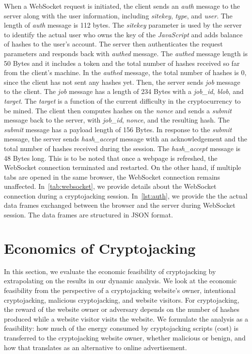 \documentclass[acmlarge]{acmart}
\newcommand{\js}{{\em JavaScript}\xspace}
\newcommand{\cj}{cryptojacking\xspace}
\begin{document}
When a WebSocket request is initiated, the client sends an {\em auth} message to the server along with the user information, including {\em sitekey}, {\em type}, and {\em user}. The length of {\em auth} message is 112 bytes. The {\em sitekey} parameter is used by the server to identify the actual user who owns the key of the \js and adds balance of hashes to the user's account. The server then authenticates the request parameters and responds back with {\em authed} message. The {\em authed} message length is 50 Bytes and it includes a token and the total number of hashes received so far from the client's machine. In the {\em authed} message,  the total number of hashes is 0, since the client has not sent any hashes yet. Then, the server sends {\em job} message to the client. The {\em job} message has a length of 234 Bytes with a {\em job\_id}, {\em blob}, and {\em target}. The {\em target} is a function of the current difficulty in the cryptocurrency to be mined. The client then computes hashes on the {\em nonce} and sends a {\em submit} message back to the server, with {\em job\_id}, {\em nonce}, and the resulting hash. The {\em submit} message has a payload length of 156 Bytes. In response to the {\em submit} message, the server sends {\em hash\_accept} message with an acknowledgement and the total number of hashes received during the session. The {\em hash\_accept} message is 48 Bytes long. This is to be noted that once a webpage is refreshed, the WebSocket connection terminated and restarted. On the other hand, if multiple tabs are opened in the same browser, the WebSocket connection remains unaffected. In~\autoref{tab:websocket}, we provide details about the WebSocket connection during a \cj session. In~\autoref{lst:auth}, we provide the the actual data frames exchanged between the browser and the server during WebSocket session. The data frames are structured in JSON format.  




\section{Economics of Cryptojacking} \label{sec:economic}
In this section, we evaluate the economic feasibility of \cj by extrapolating on the results in our dynamic analysis. We look at the economic feasibility from the perspective of a \cj website's owner, intentional \cj, malicious \cj, and website visitors. For \cj, the reward of the website owner or adversary depends on the number of hashes produced while a website visitor visits the website.  We formulate the analysis as a feasibility: how much of the energy consumed by \cj scripts (cost) is transferred to the \cj website owner, whether malicious or benign, and how that translates as an alternative to online advertisement. 
\end{document}
